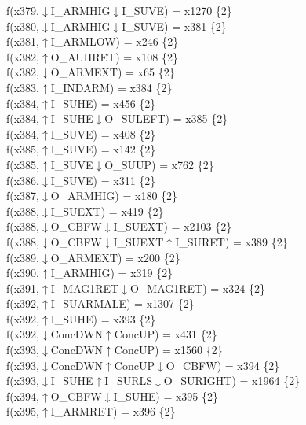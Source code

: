 f(x379,$\downarrow$I\_ARMHIG$\downarrow$I\_SUVE) = x1270 \{2\} \\  
f(x380,$\downarrow$I\_ARMHIG$\downarrow$I\_SUVE) = x381 \{2\} \\  
f(x381,$\uparrow$I\_ARMLOW) = x246 \{2\} \\  
f(x382,$\uparrow$O\_AUHRET) = x108 \{2\} \\  
f(x382,$\downarrow$O\_ARMEXT) = x65 \{2\} \\  
f(x383,$\uparrow$I\_INDARM) = x384 \{2\} \\  
f(x384,$\uparrow$I\_SUHE) = x456 \{2\} \\  
f(x384,$\uparrow$I\_SUHE$\downarrow$O\_SULEFT) = x385 \{2\} \\  
f(x384,$\uparrow$I\_SUVE) = x408 \{2\} \\  
f(x385,$\uparrow$I\_SUVE) = x142 \{2\} \\  
f(x385,$\uparrow$I\_SUVE$\downarrow$O\_SUUP) = x762 \{2\} \\  
f(x386,$\downarrow$I\_SUVE) = x311 \{2\} \\  
f(x387,$\downarrow$O\_ARMHIG) = x180 \{2\} \\  
f(x388,$\downarrow$I\_SUEXT) = x419 \{2\} \\  
f(x388,$\downarrow$O\_CBFW$\downarrow$I\_SUEXT) = x2103 \{2\} \\  
f(x388,$\downarrow$O\_CBFW$\downarrow$I\_SUEXT$\uparrow$I\_SURET) = x389 \{2\} \\  
f(x389,$\downarrow$O\_ARMEXT) = x200 \{2\} \\  
f(x390,$\uparrow$I\_ARMHIG) = x319 \{2\} \\  
f(x391,$\uparrow$I\_MAG1RET$\downarrow$O\_MAG1RET) = x324 \{2\} \\  
f(x392,$\uparrow$I\_SUARMALE) = x1307 \{2\} \\  
f(x392,$\uparrow$I\_SUHE) = x393 \{2\} \\  
f(x392,$\downarrow$ConcDWN$\uparrow$ConcUP) = x431 \{2\} \\  
f(x393,$\downarrow$ConcDWN$\uparrow$ConcUP) = x1560 \{2\} \\  
f(x393,$\downarrow$ConcDWN$\uparrow$ConcUP$\downarrow$O\_CBFW) = x394 \{2\} \\  
f(x393,$\downarrow$I\_SUHE$\uparrow$I\_SURLS$\downarrow$O\_SURIGHT) = x1964 \{2\} \\  
f(x394,$\uparrow$O\_CBFW$\downarrow$I\_SUHE) = x395 \{2\} \\  
f(x395,$\uparrow$I\_ARMRET) = x396 \{2\} \\  
